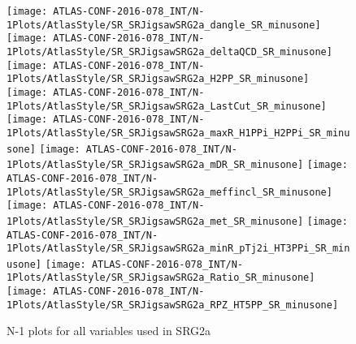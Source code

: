 \begin{figure}[tbp]
\begin{center}
\texttt{[image: ATLAS-CONF-2016-078\_INT/N-1Plots/AtlasStyle/SR\_SRJigsawSRG2a\_dangle\_SR\_minusone]}
\texttt{[image: ATLAS-CONF-2016-078\_INT/N-1Plots/AtlasStyle/SR\_SRJigsawSRG2a\_deltaQCD\_SR\_minusone]}
\texttt{[image: ATLAS-CONF-2016-078\_INT/N-1Plots/AtlasStyle/SR\_SRJigsawSRG2a\_H2PP\_SR\_minusone]}
\texttt{[image: ATLAS-CONF-2016-078\_INT/N-1Plots/AtlasStyle/SR\_SRJigsawSRG2a\_LastCut\_SR\_minusone]}
\texttt{[image: ATLAS-CONF-2016-078\_INT/N-1Plots/AtlasStyle/SR\_SRJigsawSRG2a\_maxR\_H1PPi\_H2PPi\_SR\_minusone]}
\texttt{[image: ATLAS-CONF-2016-078\_INT/N-1Plots/AtlasStyle/SR\_SRJigsawSRG2a\_mDR\_SR\_minusone]}
\texttt{[image: ATLAS-CONF-2016-078\_INT/N-1Plots/AtlasStyle/SR\_SRJigsawSRG2a\_meffincl\_SR\_minusone]}
\texttt{[image: ATLAS-CONF-2016-078\_INT/N-1Plots/AtlasStyle/SR\_SRJigsawSRG2a\_met\_SR\_minusone]}
\texttt{[image: ATLAS-CONF-2016-078\_INT/N-1Plots/AtlasStyle/SR\_SRJigsawSRG2a\_minR\_pTj2i\_HT3PPi\_SR\_minusone]}
\texttt{[image: ATLAS-CONF-2016-078\_INT/N-1Plots/AtlasStyle/SR\_SRJigsawSRG2a\_Ratio\_SR\_minusone]}
\texttt{[image: ATLAS-CONF-2016-078\_INT/N-1Plots/AtlasStyle/SR\_SRJigsawSRG2a\_RPZ\_HT5PP\_SR\_minusone]}
\end{center}
\caption{N-1 plots for all variables used in SRG2a}
\label{fig:SR_SRJigsawSRG2a_dangle_SR_minusone}
\end{figure}

